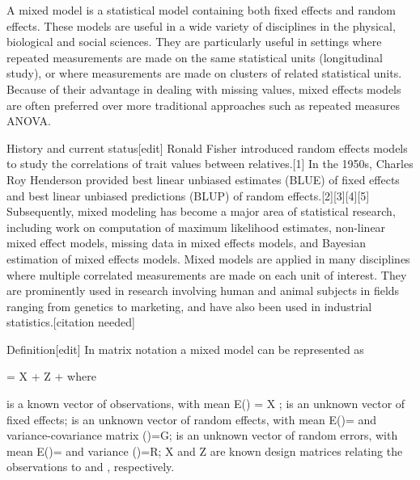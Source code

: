 A mixed model is a statistical model containing both fixed effects and random effects. These models are useful in a wide variety of disciplines in the physical, biological and social sciences. They are particularly useful in settings where repeated measurements are made on the same statistical units (longitudinal study), or where measurements are made on clusters of related statistical units. Because of their advantage in dealing with missing values, mixed effects models are often preferred over more traditional approaches such as repeated measures ANOVA.


History and current status[edit]
Ronald Fisher introduced random effects models to study the correlations of trait values between relatives.[1] In the 1950s, Charles Roy Henderson provided best linear unbiased estimates (BLUE) of fixed effects and best linear unbiased predictions (BLUP) of random effects.[2][3][4][5] Subsequently, mixed modeling has become a major area of statistical research, including work on computation of maximum likelihood estimates, non-linear mixed effect models, missing data in mixed effects models, and Bayesian estimation of mixed effects models. Mixed models are applied in many disciplines where multiple correlated measurements are made on each unit of interest. They are prominently used in research involving human and animal subjects in fields ranging from genetics to marketing, and have also been used in industrial statistics.[citation needed]

Definition[edit]
In matrix notation a mixed model can be represented as

 = X \boldsymbol{\beta} + Z  + \boldsymbol{\epsilon}
where

 is a known vector of observations, with mean E() = X \boldsymbol{\beta};
\boldsymbol{\beta} is an unknown vector of fixed effects;
 is an unknown vector of random effects, with mean E()= and variance-covariance matrix ()=G;
\boldsymbol{\epsilon} is an unknown vector of random errors, with mean E(\boldsymbol{\epsilon})= and variance (\boldsymbol{\epsilon})=R;
X and Z are known design matrices relating the observations  to \boldsymbol{\beta} and , respectively.
